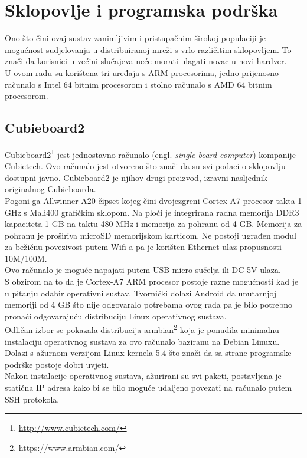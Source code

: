 \documentclass[times, utf8, zavrsni, numeric]{fer}
\begin{document}
\section{Sklopovlje i programska podrška}
Ono što čini ovaj sustav zanimljivim i pristupačnim širokoj populaciji je mogućnost sudjelovanja u distribuiranoj mreži s vrlo
različitim sklopovljem. To znači da korisnici u većini slučajeva neće morati ulagati novac u novi hardver.\\ U ovom radu su korištena
tri uređaja s ARM procesorima, jedno prijenosno računalo s Intel 64 bitnim procesorom i stolno računalo s AMD 64 bitnim procesorom.
\subsection{Cubieboard2}
Cubieboard2\footnote{\url{http://www.cubietech.com/}} jest jednostavno računalo (engl. \emph{single-board computer}) kompanije Cubietech. Ovo računalo jest otvoreno
što znači da su svi podaci o sklopovlju dostupni javno. Cubieboard2 je njihov drugi proizvod, izravni nasljednik originalnog Cubieboarda.\\
Pogoni ga Allwinner A20 čipset kojeg čini dvojezgreni Cortex-A7 procesor takta 1 GHz s Mali400 grafičkim sklopom. 
Na ploči je integrirana radna memorija DDR3 kapaciteta 1 GB na taktu 480 MHz i memorija za pohranu od 4 GB. Memorija za pohranu je 
proširiva microSD memorijskom karticom.
Ne postoji ugrađen modul za bežičnu povezivost putem Wifi-a pa je korišten Ethernet ulaz propusnosti 10M/100M. \\
Ovo računalo je moguće napajati putem USB micro sučelja ili DC 5V ulaza. \\
S obzirom na to da je Cortex-A7 ARM procesor postoje razne mogućnosti kad je u pitanju odabir operativni sustav. Tvornički dolazi
Android da unutarnjoj memoriji od 4 GB što nije odgovaralo potrebama ovog rada pa je bilo potrebno pronaći odgovarajuću distribuciju
Linux operativnog sustava.\\ Odličan izbor se pokazala distribucija armbian\footnote{\url{https://www.armbian.com/}} koja je ponudila minimalnu instalaciju operativnog sustava
za ovo računalo baziranu na Debian Linuxu. Dolazi s ažurnom verzijom Linux kernela 5.4 što znači da sa strane programske podrške
postoje dobri uvjeti. \\
Nakon instalacije operativnog sustava, ažurirani su svi paketi, postavljena je statična IP adresa kako bi se bilo moguće udaljeno
povezati na računalo putem SSH protokola. 
\end{document}
